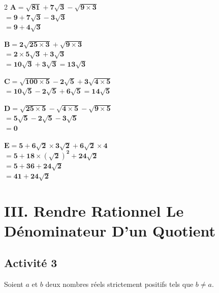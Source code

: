 \documentclass[12pt,a4paper]{article}
\begin{document}
\vspace{0.4cm}
\begin{multicols}{2}
\noindent
$\mathbf{A = \sqrt{81} + 7\sqrt{3} - \sqrt{9 \times 3}}$ \\[0.1cm]
$\mathbf{= 9 + 7\sqrt{3} - 3\sqrt{3}}$ \\[0.1cm]
$\mathbf{= 9 + 4\sqrt{3}}$

\vspace{0.4cm}
\noindent
$\mathbf{B = 2\sqrt{25 \times 3} + \sqrt{9 \times 3}}$ \\[0.1cm]
$\mathbf{= 2 \times 5\sqrt{3} + 3\sqrt{3}}$ \\[0.1cm]
$\mathbf{= 10\sqrt{3} + 3\sqrt{3} = 13\sqrt{3}}$

\vspace{0.4cm}
\noindent
$\mathbf{C = \sqrt{100 \times 5} - 2\sqrt{5} + 3\sqrt{4 \times 5}}$ \\[0.1cm]
$\mathbf{= 10\sqrt{5} - 2\sqrt{5} + 6\sqrt{5} = 14\sqrt{5}}$

\columnbreak

\noindent
$\mathbf{D = \sqrt{25 \times 5} - \sqrt{4 \times 5} - \sqrt{9 \times 5}}$ \\[0.1cm]
$\mathbf{= 5\sqrt{5} - 2\sqrt{5} - 3\sqrt{5}}$ \\[0.1cm]
$\mathbf{= 0}$

\vspace{0.4cm}
\noindent
$\mathbf{E = 5 + 6\sqrt{2} \times 3\sqrt{2} + 6\sqrt{2} \times 4}$ \\[0.1cm]
$\mathbf{= 5 + 18 \times \left(\sqrt{2}\right)^2 + 24\sqrt{2}}$ \\[0.1cm]
$\mathbf{= 5 + 36 + 24\sqrt{2}}$ \\[0.1cm]
$\mathbf{= 41 + 24\sqrt{2}}$
\end{multicols}
\section*{\color{myred}III. Rendre Rationnel Le Dénominateur D'un Quotient}

\subsection*{\color{myred} Activité 3 }

\vspace{0.3cm}
\noindent
Soient $a$ et $b$ deux nombres réels strictement positifs tels que $b \neq a$.
\end{document}
